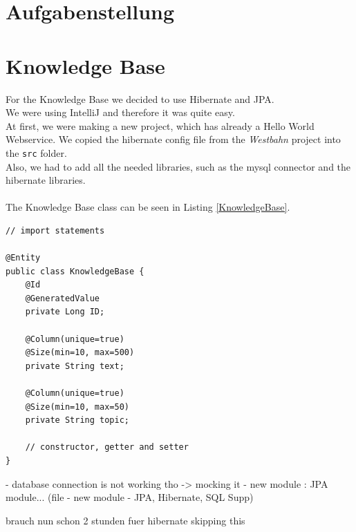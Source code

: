 \documentclass[12pt]{article}
\begin{document}
\section{Aufgabenstellung}

\section{Knowledge Base}
For the Knowledge Base we decided to use Hibernate and JPA. \\
We were using IntelliJ and therefore it was quite easy. \\
At first, we were making a new project, which has already a Hello World Webservice. We copied the hibernate config file from the \textit{Westbahn} project into the \texttt{src} folder.\\
Also, we had to add all the needed libraries, such as the mysql connector and the hibernate libraries.\\
\\
The Knowledge Base class can be seen in Listing \ref{KnowledgeBase}.
\begin{lstlisting}[caption=KnowledgeBase entity class, label=KnowledgeBase]
// import statements

@Entity
public class KnowledgeBase {
    @Id
    @GeneratedValue
    private Long ID;

    @Column(unique=true)
    @Size(min=10, max=500)
    private String text;

    @Column(unique=true)
    @Size(min=10, max=50)
    private String topic;

	// constructor, getter and setter
}
\end{lstlisting}

- database connection is not working tho
-> mocking it
- new module : JPA module... (file - new module - JPA, Hibernate, SQL Supp)


brauch nun schon 2 stunden fuer hibernate
skipping this
\end{document}

